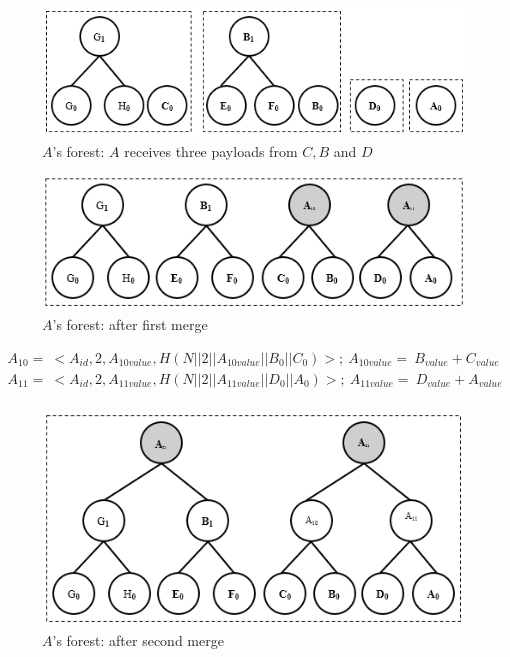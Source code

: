 \documentclass[%
  slidesonly,%
  semlayer%
  ]{seminar}                                  %
\begin{document}
\begin{slide}
      \begin{figure}[h!]
        \centering
        \includegraphics[scale = 0.5]{images/a-forest.png}
        \caption{$A$'s forest: $A$ receives three payloads from $C,B$ and $D$}
        \label{fig:a-forest}
      \end{figure}
      \vfill
      \clearpage

      \begin{figure}[h!]
        \centering
        \includegraphics[scale = 0.5]{images/a-forest-first-merge.png}
        \caption{$A$'s forest: after first merge}
        \label{fig:a-forest-first-merge}
      \end{figure}
      \begin{equation*}
        \begin{array}{l}
          A_{10} =\ <A_{id},2,A_{10value},H(N||2||A_{10value}||B_{0}||C_{0})>;\ A_{10value} =\ B_{value} + C_{value}\\
          A_{11} =\ <A_{id},2,A_{11value},H(N||2||A_{11value}||D_{0}||A_{0})>;\ A_{11value} =\ D_{value} + A_{value}\\
        \end{array}     
      \end{equation*}

      \begin{figure}[h!]
        \centering
        \includegraphics[scale = 0.5]{images/a-forest-second-merge.png}
        \caption{$A$'s forest: after second merge}
        \label{fig:a-forest-second-merge}
      \end{figure}


\end{slide}
\end{document}

